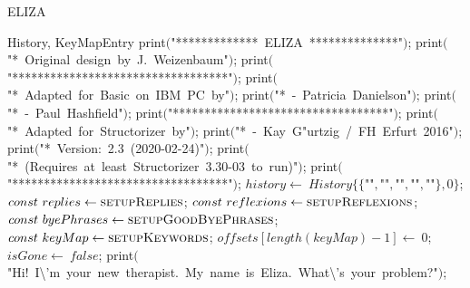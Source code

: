 \documentclass[a4paper,10pt]{article}
\begin{document}
\begin{algorithm}
\caption{ELIZA}
\begin{algorithmic}[5]
\State {}
\State {}
\State {}
\State {}
\State {}
\State {}
\State {}
\State {}
\State {}
\State {}
\State {}
    \State History, KeyMapEntry
  \EndDecl
  \State \(\)print\((\)"{}*************\ ELIZA\ **************"{}\()\);
  \State \(\)print\((\)"{}*\ Original\ design\ by\ J.\ Weizenbaum"{}\()\);
  \State \(\)print\((\)"{}**********************************"{}\()\);
  \State \(\)print\((\)"{}*\ Adapted\ for\ Basic\ on\ IBM\ PC\ by"{}\()\);
  \State \(\)print\((\)"{}*\ -\ Patricia\ Danielson"{}\()\);
  \State \(\)print\((\)"{}*\ -\ Paul\ Hashfield"{}\()\);
  \State \(\)print\((\)"{}**********************************"{}\()\);
  \State \(\)print\((\)"{}*\ Adapted\ for\ Structorizer\ by"{}\()\);
  \State \(\)print\((\)"{}*\ -\ Kay\ G"urtzig\ /\ FH\ Erfurt\ 2016"{}\()\);
  \State \(\)print\((\)"{}*\ Version:\ 2.3\ (2020-02-24)"{}\()\);
  \State \(\)print\((\)"{}*\ (Requires\ at\ least\ Structorizer\ 3.30-03\ to\ run)"{}\()\);
  \State \(\)print\((\)"{}**********************************"{}\()\);
  \State {}
  \State {}
  \State \(history\gets\ History\{\{\)"{}"{}\(,\)"{}"{}\(,\)"{}"{}\(,\)"{}"{}\(,\)"{}"{}\(\},0\}\);
  \State \(const\ replies\gets\Call{setupReplies}{}\);
  \State \(const\ reflexions\gets\Call{setupReflexions}{}\);
  \State \(const\ byePhrases\gets\Call{setupGoodByePhrases}{}\);
  \State \(const\ keyMap\gets\Call{setupKeywords}{}\);
  \State \(offsets[length(keyMap)-1]\gets\ 0\);
  \State \(isGone\gets\ false\);
  \State \(\)print\((\)"{}Hi!\ I\textbackslash{}'{}m\ your\ new\ therapist.\ My\ name\ is\ Eliza.\ What\textbackslash{}'{}s\ your\ problem?"{}\()\);

\end{algorithmic}
\end{algorithm}
\end{document}
